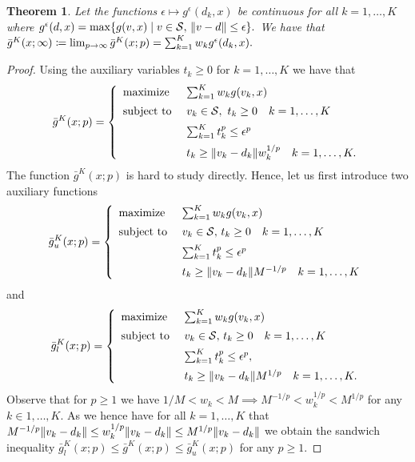 \documentclass[12pt]{article}
\theoremstyle{thmstyleone}%
\newtheorem{theorem}{Theorem}%
\theoremstyle{thmstyletwo}%
\theoremstyle{thmstylethree}%
\begin{document}
\begin{appendices}
\begin{theorem}
  \label{thm:extreme-case-infinity}
  Let the functions $\epsilon \mapsto g^\epsilon(d_k, x)$ be continuous for all $k= 1,\dots, K$ where
\(
  g^{\epsilon}(d, x)= \max \{g(v, x) \mid v\in \mathcal{S},\,\| v-d \|\leq \epsilon\}.
\)
We have that
\(
  \bar g^K(x;\infty)\coloneqq\lim_{p\to\infty} \bar g^K(x;p) = \sum_{k=1}^K w_k g^{\epsilon}(d_k, x).
  \)
\end{theorem}
\begin{proof}
  Using the auxiliary variables $t_k\geq 0$ for $k= 1,\dots, K$ we have that
  \[
    \bar g^K(x; p)
    =
    \left\{
      \begin{array}{l@{~~~~}l}
	      \mbox{maximize} & \sum_{k=1}^K w_k g(v_k, x) \\[0.5em]
        \mbox{subject to} & v_k\in \supp, ~ t_k\geq 0\quad k = 1,\dots,K\\[0.5em]
             &  \sum_{k=1}^K t_k^p \leq \epsilon^p\\[0.5em]
             &  t_k\geq \norm{v_k-d_k} w_k^{1/p} \quad k  =1,\dots,K.
      \end{array}
    \right.
  \]
  The function $\bar g^K(x;p)$ is hard to study directly. Hence, let us first introduce two auxiliary functions
  \[
    \bar{g}^K_u(x; p)
    =
    \left\{
      \begin{array}{l@{~~~~}l}
	      \mbox{maximize} & \sum_{k=1}^K w_k g(v_k, x) \\[0.5em]
        \mbox{subject to} & v_k\in \supp, \, t_k\geq 0 \quad k = 1,\dots,K\\[0.5em]
             &  \sum_{k=1}^K t_k^p \leq \epsilon^p\\[0.5em]
             &  t_k\geq \norm{v_k-d_k} M^{-1/p} \quad k = 1,\dots,K
      \end{array}
    \right.
  \]
  and
    \[
    \bar{g}^K_l(x; p)
    =
    \left\{
      \begin{array}{l@{~~~~}l}
	      \mbox{maximize} & \sum_{k=1}^K w_k g(v_k, x) \\[0.5em]
        \mbox{subject to} & v_k\in \supp, \, t_k\geq 0 \quad k = 1,\dots,K\\[0.5em]
             &  \sum_{k=1}^K t_k^p \leq \epsilon^p,\\[0.5em]
             &  t_k\geq \norm{v_k-d_k} M^{1/p} \quad k = 1,\dots,K.
      \end{array}
    \right.
  \]
  Observe that for $p\geq 1$ we have $1/M<w_k<M \implies M^{-1/p} < w^{1/p}_k < M^{1/p}$ for any $k\in 1,\dots, K$.
  As we hence have for all $k= 1,\dots, K$ that
  \(
    M^{-1/p} \| v_k-d_k \| \leq w_k^{1/p} \| v_k-d_k \|  \leq M^{1/p} \| v_k-d_k \|
  \)
  we obtain the sandwich inequality $\bar{g}^K_l(x; p) \leq \bar{g}^K(x; p) \leq \bar{g}^K_u(x; p)$ for any $p\geq 1$.


\end{proof}
\end{appendices}
\end{document}
